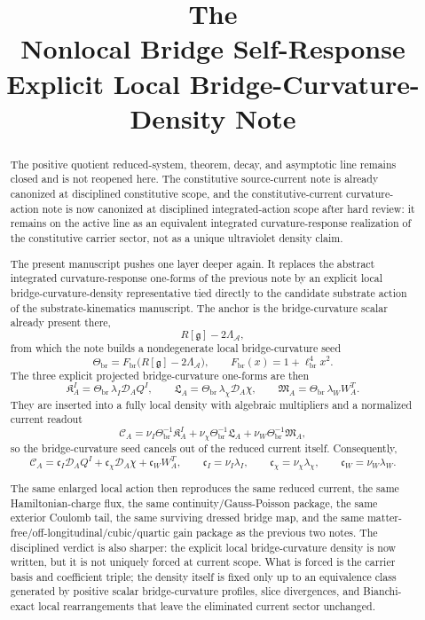 \documentclass[11pt]{article}
\title{\textbf{The \TheoryName{}}\\[0.4em]
\large Nonlocal Bridge Self-Response Explicit Local Bridge-Curvature-Density Note}
\author{}
\date{}
\newcommand{\Sub}{\mathcal{A}}
\newcommand{\BridgeMetric}{\mathfrak g}
\newcommand{\SpatialD}{\mathcal D}
\newcommand{\ConstCurrent}{\mathcal C}
\newcommand{\CurvSeed}{\Theta_{\mathrm{br}}}
\newcommand{\CurvScale}{\ell_{\mathrm{br}}}
\newcommand{\CurvProfile}{F_{\mathrm{br}}}
\newcommand{\CurvOneI}{\mathfrak K}
\newcommand{\CurvOneChi}{\mathfrak L}
\newcommand{\CurvOneW}{\mathfrak M}
\begin{document}
\maketitle

\begin{abstract}
The positive quotient reduced-system, theorem, decay, and asymptotic line remains closed and is not reopened here. The constitutive source-current note is already canonized at disciplined constitutive scope, and the constitutive-current curvature-action note is now canonized at disciplined integrated-action scope after hard review: it remains on the active line as an equivalent integrated curvature-response realization of the constitutive carrier sector, not as a unique ultraviolet density claim.

The present manuscript pushes one layer deeper again. It replaces the abstract integrated curvature-response one-forms of the previous note by an explicit local bridge-curvature-density representative tied directly to the candidate substrate action of the substrate-kinematics manuscript. The anchor is the bridge-curvature scalar already present there,
\[
R[\BridgeMetric]-2\Lambda_{\Sub},
\]
from which the note builds a nondegenerate local bridge-curvature seed
\[
\CurvSeed=\CurvProfile\!\bigl(R[\BridgeMetric]-2\Lambda_{\Sub}\bigr),
\qquad
\CurvProfile(x)=1+\CurvScale^4x^2.
\]
The three explicit projected bridge-curvature one-forms are then
\[
\CurvOneI_A^I=\CurvSeed\,\lambda_I\SpatialD_AQ^I,
\qquad
\CurvOneChi_A=\CurvSeed\,\lambda_\chi\SpatialD_A\chi,
\qquad
\CurvOneW_A=\CurvSeed\,\lambda_WW_A^T.
\]
They are inserted into a fully local density with algebraic multipliers and a normalized current readout
\[
\ConstCurrent_A
=
\nu_I\CurvSeed^{-1}\CurvOneI_A^I
+\nu_\chi\CurvSeed^{-1}\CurvOneChi_A
+\nu_W\CurvSeed^{-1}\CurvOneW_A,
\]
so the bridge-curvature seed cancels out of the reduced current itself. Consequently,
\[
\ConstCurrent_A
=
\mathfrak c_I\SpatialD_AQ^I
+\mathfrak c_\chi\SpatialD_A\chi
+\mathfrak c_WW_A^T,
\qquad
\mathfrak c_I=\nu_I\lambda_I,
\qquad
\mathfrak c_\chi=\nu_\chi\lambda_\chi,
\qquad
\mathfrak c_W=\nu_W\lambda_W.
\]

The same enlarged local action then reproduces the same reduced current, the same Hamiltonian-charge flux, the same continuity/Gauss-Poisson package, the same exterior Coulomb tail, the same surviving dressed bridge map, and the same matter-free/off-longitudinal/cubic/quartic gain package as the previous two notes. The disciplined verdict is also sharper: the explicit local bridge-curvature density is now written, but it is not uniquely forced at current scope. What is forced is the carrier basis and coefficient triple; the density itself is fixed only up to an equivalence class generated by positive scalar bridge-curvature profiles, slice divergences, and Bianchi-exact local rearrangements that leave the eliminated current sector unchanged.
\end{abstract}
\end{document}
